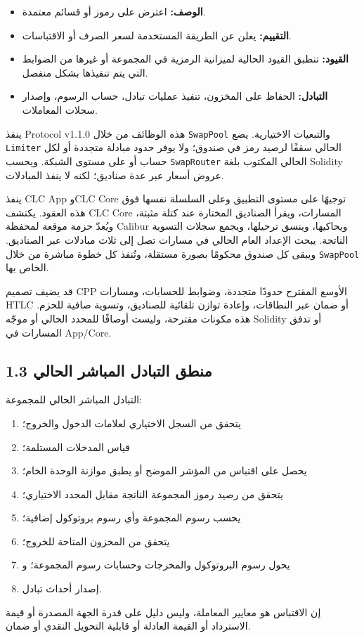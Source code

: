 \documentclass[11pt]{article}
\begin{document}
\begin{itemize}[leftmargin=*]
\item \textbf{الوصف:} اعترض على رموز أو قسائم معتمدة.
\item \textbf{التقييم:} يعلن عن الطريقة المستخدمة لسعر الصرف أو الاقتباسات.
\item \textbf{القيود:} تنطبق القيود الحالية لميزانية الرمزية في المجموعة أو غيرها من الضوابط التي يتم تنفيذها بشكل منفصل.
\item \textbf{التبادل:} الحفاظ على المخزون، تنفيذ عمليات تبادل، حساب الرسوم، وإصدار سجلات المعاملات.
\end{itemize}
ينفذ Protocol v1.1.0 هذه الوظائف من خلال \texttt{SwapPool} والتبعيات الاختيارية. يضع \texttt{Limiter} الحالي سقفًا لرصيد رمز في صندوق؛ ولا يوفر حدود مبادلة متجددة أو لكل حساب أو على مستوى الشبكة. ويحسب \texttt{SwapRouter} الحالي المكتوب بلغة Solidity عروض أسعار عبر عدة صناديق؛ لكنه لا ينفذ المبادلات.

ينفذ CLC App وCLC Core توجيهًا على مستوى التطبيق وعلى السلسلة نفسها فوق هذه العقود. يكتشف CLC Core المسارات، ويقرأ الصناديق المختارة عند كتلة مثبتة، ويُعدّ حزمة موقعة لمحفظة Calibur ويحاكيها، وينسق ترحيلها، ويجمع سجلات التسوية الناتجة. يبحث الإعداد العام الحالي في مسارات تصل إلى ثلاث مبادلات عبر الصناديق. ويبقى كل صندوق محكومًا بصورة مستقلة، وتُنفذ كل خطوة مباشرة من خلال \texttt{SwapPool} الخاص بها.

قد يضيف تصميم CPP الأوسع المقترح حدودًا متجددة، وضوابط للحسابات، ومسارات HTLC أو ضمان عبر النطاقات، وإعادة توازن تلقائية للصناديق، وتسوية صافية للحزم. هذه مكونات مقترحة، وليست أوصافًا للمحدد الحالي أو موجّه Solidity أو تدفق المسارات في App/Core.

\subsection*{1.3 منطق التبادل المباشر الحالي}

التبادل المباشر الحالي للمجموعة:

\begin{enumerate}[leftmargin=*]
\item يتحقق من السجل الاختياري لعلامات الدخول والخروج؛
\item قياس المدخلات المستلمة؛
\item يحصل على اقتباس من المؤشر الموضح أو يطبق موازنة الوحدة الخام؛
\item يتحقق من رصيد رموز المجموعة الناتجة مقابل المحدد الاختياري؛
\item يحسب رسوم المجموعة وأي رسوم بروتوكول إضافية؛
\item يتحقق من المخزون المتاحة للخروج؛
\item يحول رسوم البروتوكول والمخرجات وحسابات رسوم المجموعة؛ و
\item إصدار أحداث تبادل.
\end{enumerate}
إن الاقتباس هو معايير المعاملة، وليس دليل على قدرة الجهة المصدرة أو قيمة الاسترداد أو القيمة العادلة أو قابلية التحويل النقدي أو ضمان.
\end{document}
